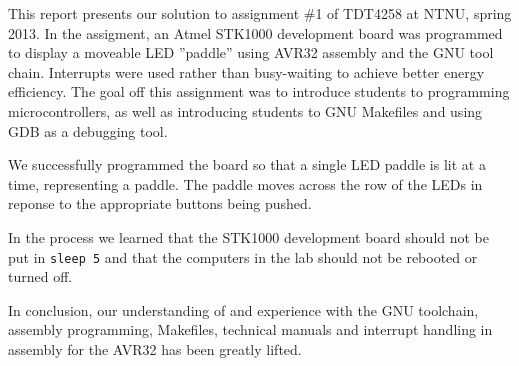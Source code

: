 This report presents our solution to assignment \#1 of TDT4258 at NTNU, spring 2013.
In the assigment, an Atmel STK1000 development board was programmed to display a moveable LED ''paddle'' using AVR32 assembly and the GNU tool chain.
Interrupts were used rather than busy-waiting to achieve better energy efficiency.
The goal off this assignment was to introduce students to programming microcontrollers, as well as introducing students to GNU Makefiles and using GDB as a debugging tool.

We successfully programmed the board so that a single LED paddle is lit at a time, representing a paddle. The paddle moves across the row of the LEDs in reponse to the appropriate buttons being pushed.

In the process we learned that the STK1000 development board should not be put in \texttt{sleep 5} and that the computers in the lab should not be rebooted or turned off.

In conclusion, our understanding of and experience with the GNU toolchain, assembly programming, Makefiles, technical manuals and interrupt handling in assembly for the AVR32 has been greatly lifted.

